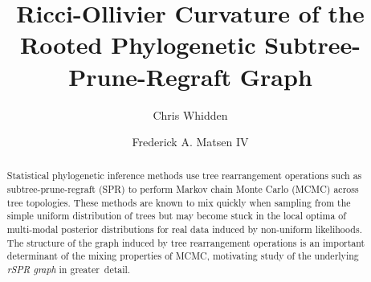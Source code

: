 \documentclass[]{elsarticle}
\begin{document}

\begin{frontmatter}


	\title{Ricci-Ollivier Curvature of the Rooted Phylogenetic Subtree-Prune-Regraft Graph}


	\author{Chris Whidden}

\author{Frederick A. Matsen IV}


\address{Program in Computational Biology, Fred Hutchinson Cancer Research Center, Seattle, WA, USA 98109}

\begin{abstract}
Statistical phylogenetic inference methods use tree rearrangement operations such as subtree-prune-regraft (SPR) to perform Markov chain Monte Carlo (MCMC) across tree topologies.
These methods are known to mix quickly when sampling from the simple uniform distribution of trees but may become stuck in the local optima of multi-modal posterior distributions for real data induced by non-uniform likelihoods.
The structure of the graph induced by tree rearrangement operations is an important determinant of the mixing properties of MCMC, motivating study of the underlying \emph{rSPR graph} in greater~detail.


\end{abstract}
\end{frontmatter}
\end{document}
